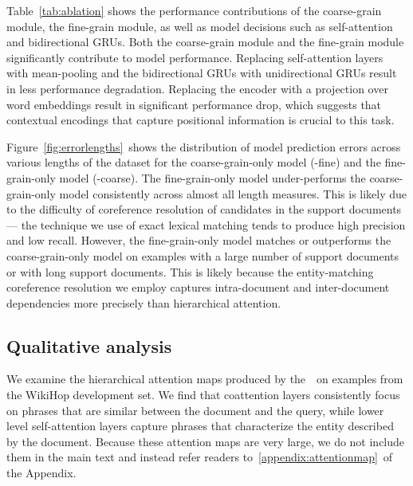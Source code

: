 \documentclass{article} \usepackage{iclr2019_conference,times}
\begin{document}
Table~\ref{tab:ablation} shows the performance contributions of the coarse-grain module, the fine-grain module, as well as model decisions such as self-attention and bidirectional GRUs.
Both the coarse-grain module and the fine-grain module significantly contribute to model performance.
Replacing self-attention layers with mean-pooling and the bidirectional GRUs with unidirectional GRUs result in less performance degradation.
Replacing the encoder with a projection over word embeddings result in significant performance drop, which suggests that contextual encodings that capture positional information is crucial to this task.



Figure~\ref{fig:errorlengths}~shows the distribution of model prediction errors across various lengths of the dataset for the coarse-grain-only model (-fine) and the fine-grain-only model (-coarse).
The fine-grain-only model under-performs the coarse-grain-only model consistently across almost all length measures.
This is likely due to the difficulty of coreference resolution of candidates in the support documents --- the technique we use of exact lexical matching tends to produce high precision and low recall.
However, the fine-grain-only model matches or outperforms the coarse-grain-only model on examples with a large number of support documents or with long support documents.
This is likely because the entity-matching coreference resolution we employ captures intra-document and inter-document dependencies more precisely than hierarchical attention.






\subsection{Qualitative analysis}
\label{sec:attention}


We examine the hierarchical attention maps produced by the~\modelnameshort~on examples from the WikiHop development set.
We find that coattention layers consistently focus on phrases that are similar between the document and the query, while lower level self-attention layers capture phrases that characterize the entity described by the document.
Because these attention maps are very large, we do not include them in the main text and instead refer readers to~\ref{appendix:attentionmap}~of the Appendix.
\end{document}

